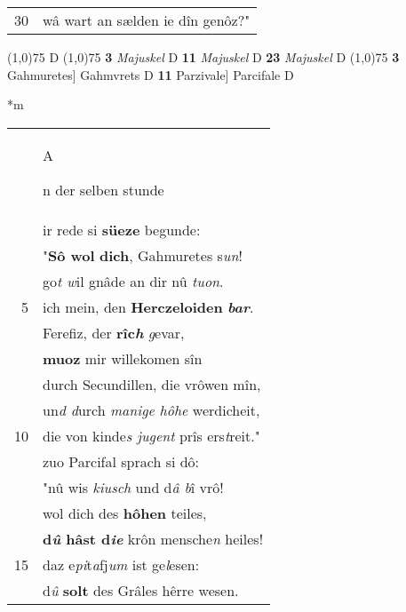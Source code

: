\documentclass[8pt,a4paper,notitlepage]{article}
\begin{document}
\begin{table}[ht]
\begin{minipage}[t]{0.5\linewidth}
\begin{tabular}{rl}
30 & wâ wart an sælden ie dîn genôz?"\\ 
\end{tabular}
\scriptsize
\line(1,0){75} \newline
D \newline
\line(1,0){75} \newline
\textbf{3} \textit{Majuskel} D  \textbf{11} \textit{Majuskel} D  \textbf{23} \textit{Majuskel} D  \newline
\line(1,0){75} \newline
\textbf{3} Gahmuretes] Gahmvrets D \textbf{11} Parzivale] Parcifale D \newline
\end{minipage}
\hspace{0.5cm}
\begin{minipage}[t]{0.5\linewidth}
\small
\begin{center}*m
\end{center}
\begin{tabular}{rl}
 & \begin{large}A\end{large}n der selben stunde\\ 
 & ir rede si \textbf{süeze} begunde:\\ 
 & "\textbf{Sô wol} \textbf{dich}, Gahmuretes s\textit{un}!\\ 
 & go\textit{t w}il gnâde an dir nû \textit{tuon}.\\ 
5 & ich mein, den \textbf{Herczeloiden} \textit{\textbf{bar}}.\\ 
 & Ferefiz, der \textbf{rîc\textit{h}} \textit{g}evar,\\ 
 & \textbf{muoz} mir willekomen sîn\\ 
 & durch Secundillen, die vrôwen mîn,\\ 
 & un\textit{d d}urch \textit{manige hôhe} werdicheit,\\ 
10 & die von kinde\textit{s jugent} prîs ers\textit{t}reit."\\ 
 & zuo Parcifal sprach si dô:\\ 
 & "nû wis \textit{kiusch} und d\textit{â b}î vrô!\\ 
 & wol dich des \textbf{hôhen} teiles,\\ 
 & \textbf{d\textit{û} hâst d\textit{ie}} krôn mensche\textit{n} heiles!\\ 
15 & daz e\textit{pi}t\textit{a}fj\textit{um} ist ge\textit{l}esen:\\ 
 & d\textit{û} \textbf{solt} des Grâles hêrre wesen.\\ 

\end{tabular}
\end{minipage}
\end{table}
\end{document}
